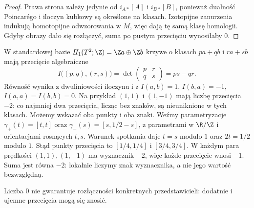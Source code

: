 \begin{proof}
Prawa strona zależy jedynie
od $i_{A*}[A]$ i $i_{B*}[B]$,
ponieważ dualność Poincarégo
i iloczyn kubkowy są
określone na klasach.
Izotopijne zanurzenia
indukują homotopijne
odwzorowania w $M$,
więc dają tę samą
klasę homologii.
Gdyby obrazy dało się
rozłączyć, suma po
pustym przecięciu
wynosiłaby $0$.
\end{proof}

\begin{przyklad}
\label{prz:przeciecia-krzywych-torus-21}
W standardowej bazie
$H_1(T^2;\Z)=\Z a\oplus\Z b$
krzywe o klasach
$pa+qb$ i $ra+sb$
mają przecięcie algebraiczne
\[
 I\bigl((p,q),(r,s)\bigr)
 =\det\begin{pmatrix}p&r\\q&s\end{pmatrix}
 =ps-qr.
\]
Równość wynika z dwuliniowości
iloczynu i z
$I(a,b)=1$, $I(b,a)=-1$,
$I(a,a)=I(b,b)=0$.
Na przykład $(1,1)$ i $(1,-1)$
mają liczbę przecięcia $-2$:
co najmniej dwa przecięcia,
licząc bez znaków, są
nieuniknione w tych klasach.
Możemy wskazać oba punkty i oba znaki.
Weźmy parametryzacje
$\gamma_+(t)=[t,t]$ oraz
$\gamma_-(s)=[s,1/2-s]$, z parametrami w $\R/\Z$
i orientacjami rosnących $t,s$.
Warunek spotkania daje $t=s$ modulo $1$ oraz
$2t=1/2$ modulo $1$. Stąd punkty przecięcia to
$[1/4,1/4]$ i $[3/4,3/4]$.
W każdym para prędkości $(1,1),(1,-1)$
ma wyznacznik $-2$, więc każde przecięcie wnosi $-1$.
Suma jest równa $-2$: lokalnie liczymy znak wyznacznika,
a nie jego wartość bezwzględną.

\begin{center}
\end{center}
Liczba $0$ nie gwarantuje
rozłączności konkretnych
przedstawicieli: dodatnie
i ujemne przecięcia mogą
się znosić.
\end{przyklad}

